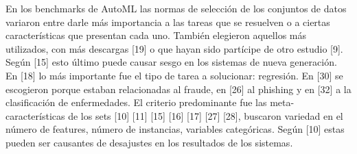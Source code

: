 En los benchmarks de AutoML las normas de selección de los conjuntos de datos variaron entre darle más importancia a las tareas que se resuelven o a ciertas características que presentan cada uno. También 
elegieron aquellos más utilizados, con más descargas [19] o que hayan sido partícipe de otro estudio [9]. Según [15] esto último puede causar sesgo en los sistemas de 
nueva generación. En [18] lo más importante fue el tipo de tarea a solucionar: regresión. En [30] se escogieron porque estaban relacionadas al fraude, en [26] al phishing y en [32] 
a la clasificación de enfermedades. El criterio predominante fue las meta-características de los sets [10] [11] [15] [16] [17] [27] [28], buscaron variedad en el número 
de features, número de instancias, variables categóricas. Según [10] estas pueden ser causantes de desajustes en los resultados de los sistemas.


